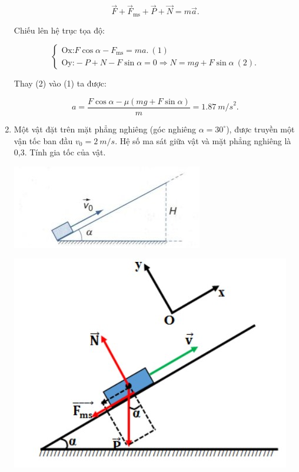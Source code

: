 \begin{enumerate}[label=\bfseries Câu \arabic*:]
{			$$\vec F + \vec F_\text{ms} + \vec P + \vec N = m\vec a.$$
		
		Chiếu lên hệ trục tọa độ:
		
		$$\begin{cases}
			\text{Ox:}  F\cos \alpha - F_\text{ms} =ma.\ (1) \\
			\text{Oy:}   - P + N - F\sin \alpha= 0 \Rightarrow N =mg + F \sin \alpha\ (2).
			
		\end{cases}$$
		
		Thay (2) vào (1) ta được:
		
		$$ a = \dfrac{F \cos \alpha - \mu (mg + F\sin \alpha)}{m} = \SI{1,87}{m/s}^2. $$
	
	}
	\item {}
	
	
	{
		Một vật đặt trên mặt phẳng nghiêng (góc nghiêng $\alpha = 30^\circ$), được truyền một vận tốc ban đầu $v_0 = \SI{2}{m/s}$. Hệ số ma sát giữa vật và mặt phẳng nghiêng là 0,3. Tính gia tốc của vật.
		\begin{center}
			\includegraphics[scale=1]{../figs/VN10-2022-PH-TP021-20.jpg}
		\end{center}
	}
	
	\hideall
	{
		\begin{center}
			\includegraphics[scale=0.6]{../figs/VN10-2022-PH-TP021-21.jpg}
		\end{center}
	
}
\end{enumerate}
